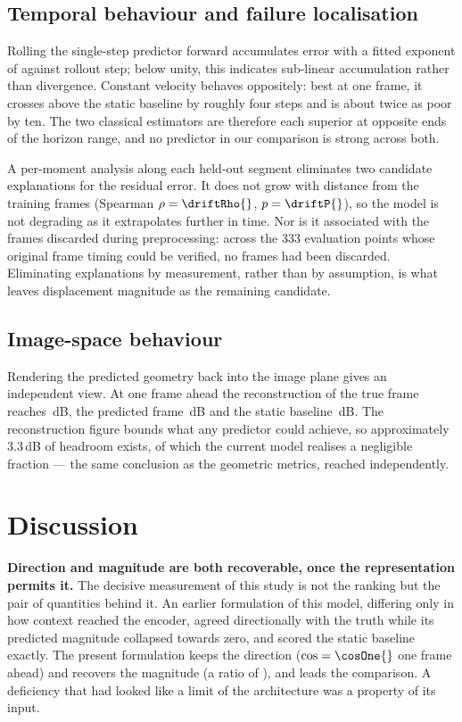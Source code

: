 \documentclass[conference]{IEEEtran}
\begin{document}
\subsection{Temporal behaviour and failure localisation}
Rolling the single-step predictor forward accumulates error with a fitted exponent
of \growthExp{} against rollout step; below unity, this indicates sub-linear
accumulation rather than divergence. Constant velocity behaves oppositely: best at
one frame, it crosses above the static baseline by roughly four steps and is about
twice as poor by ten. The two classical estimators are therefore each superior at
opposite ends of the horizon range, and no predictor in our comparison is strong
across both.

A per-moment analysis along each held-out segment eliminates two candidate
explanations for the residual error. It does not grow with distance from the
training frames (Spearman $\rho=\driftRho{}$, $p=\driftP{}$), so the model is not
degrading as it extrapolates further in time. Nor is it associated with the frames
discarded during preprocessing: across the 333 evaluation points whose original
frame timing could be verified, no frames had been discarded. Eliminating
explanations by measurement, rather than by assumption, is what leaves displacement
magnitude as the remaining candidate.

\subsection{Image-space behaviour}
Rendering the predicted geometry back into the image plane gives an independent
view. At one frame ahead the reconstruction of the true frame reaches
\imReconPSNR{}\,dB, the predicted frame \imPredPSNR{}\,dB and the static baseline
\imNaivePSNR{}\,dB. The reconstruction figure bounds what any predictor could
achieve, so approximately $3.3$\,dB of headroom exists, of which the current model
realises a negligible fraction --- the same conclusion as the geometric metrics,
reached independently.

\section{Discussion}
\label{sec:discussion}

\textbf{Direction and magnitude are both recoverable, once the representation
permits it.} The decisive measurement of this study is not the ranking but the pair
of quantities behind it. An earlier formulation of this model, differing only in how
context reached the encoder, agreed directionally with the truth while its predicted
magnitude collapsed towards zero, and scored the static baseline exactly. The present
formulation keeps the direction ($\cos = \cosOne{}$ one frame ahead) and recovers the
magnitude (a ratio of \magRatioOne{}), and leads the comparison. A deficiency that
had looked like a limit of the architecture was a property of its input.
\end{document}
